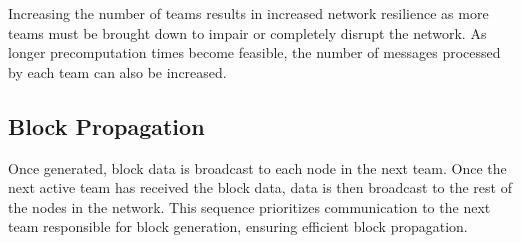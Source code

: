 Increasing the number of teams results in increased network resilience as more teams must be brought down to impair or completely disrupt the network. As longer precomputation times become feasible, the number of messages processed by each team can also be increased. 

\subsection{Block Propagation}

Once generated, block data is broadcast to each node in the next team. Once the next active team has received the block data, data is then broadcast to the rest of the nodes in the network. This sequence prioritizes communication to the next team responsible for block generation, ensuring efficient block propagation.
